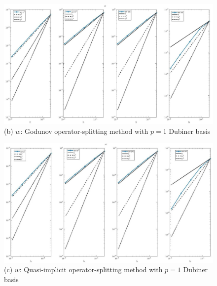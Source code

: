 \documentclass[a4paper,11pt]{article}
\begin{document}
\begin{figure}[h]
\begin{center}
\includegraphics[width =\textwidth]{./D1_w_1_GO.jpg}
\caption*{(b) $w$: Godunov operator-splitting method with $p=1$ Dubiner basis}
\end{center}
\end{figure}
\begin{figure}[H]
\begin{center}
\includegraphics[width =\textwidth]{./D1_w_1_OS.jpg}
\caption*{(c) $w$: Quasi-implicit operator-splitting method with $p=1$ Dubiner basis}
\end{center}
\end{figure}
\restoregeometry
\newpage
\end{document}
